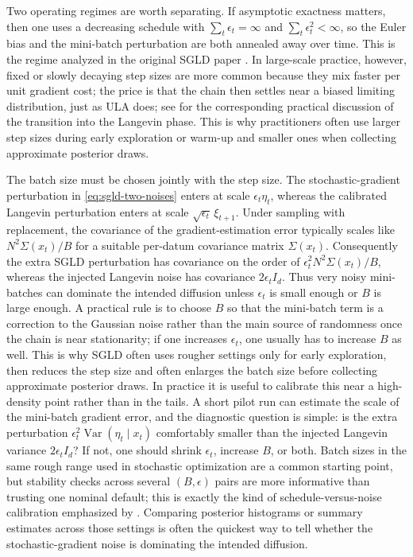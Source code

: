 Two operating regimes are worth separating.
If asymptotic exactness matters, then one uses a decreasing schedule with \(\sum_t \epsilon_t=\infty\) and \(\sum_t \epsilon_t^2<\infty\), so the Euler bias and the mini-batch perturbation are both annealed away over time.
This is the regime analyzed in the original SGLD paper \citep[\S3]{welling_teh_2011_sgld}.
In large-scale practice, however, fixed or slowly decaying step sizes are more common because they mix faster per unit gradient cost; the price is that the chain then settles near a biased limiting distribution, just as ULA does; see \citet[\S4.1]{welling_teh_2011_sgld} for the corresponding practical discussion of the transition into the Langevin phase.
This is why practitioners often use larger step sizes during early exploration or warm-up and smaller ones when collecting approximate posterior draws.

The batch size must be chosen jointly with the step size.
The stochastic-gradient perturbation in \eqref{eq:sgld-two-noises} enters at scale \(\epsilon_t\eta_t\), whereas the calibrated Langevin perturbation enters at scale \(\sqrt{\epsilon_t}\,\xi_{t+1}\).
Under sampling with replacement, the covariance of the gradient-estimation error typically scales like \(N^2\Sigma(x_t)/B\) for a suitable per-datum covariance matrix \(\Sigma(x_t)\).
Consequently the extra SGLD perturbation has covariance on the order of \(\epsilon_t^2 N^2\Sigma(x_t)/B\), whereas the injected Langevin noise has covariance \(2\epsilon_t I_d\).
Thus very noisy mini-batches can dominate the intended diffusion unless \(\epsilon_t\) is small enough or \(B\) is large enough.
A practical rule is to choose \(B\) so that the mini-batch term is a correction to the Gaussian noise rather than the main source of randomness once the chain is near stationarity; if one increases \(\epsilon_t\), one usually has to increase \(B\) as well.
This is why SGLD often uses rougher settings only for early exploration, then reduces the step size and often enlarges the batch size before collecting approximate posterior draws.
In practice it is useful to calibrate this near a high-density point rather than in the tails.
A short pilot run can estimate the scale of the mini-batch gradient error, and the diagnostic question is simple: is the extra perturbation \(\epsilon_t^2\operatorname{Var}(\eta_t\mid x_t)\) comfortably smaller than the injected Langevin variance \(2\epsilon_t I_d\)?
If not, one should shrink \(\epsilon_t\), increase \(B\), or both.
Batch sizes in the same rough range used in stochastic optimization are a common starting point, but stability checks across several \((B,\epsilon)\) pairs are more informative than trusting one nominal default; this is exactly the kind of schedule-versus-noise calibration emphasized by \citet[\S4]{welling_teh_2011_sgld}.
Comparing posterior histograms or summary estimates across those settings is often the quickest way to tell whether the stochastic-gradient noise is dominating the intended diffusion.

